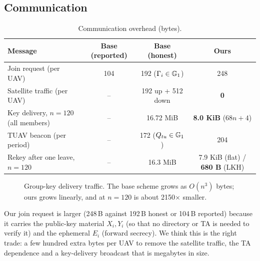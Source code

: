 \subsection{Communication}
\begin{table}[H]
\centering\small
\caption{Communication overhead (bytes).}
\label{tab:comm}
\begin{tabularx}{\linewidth}{@{}>{\raggedright\arraybackslash}X ccc@{}}
\toprule
Message & Base (reported) & Base (honest) & \textbf{Ours}\\
\midrule
Join request (per UAV) & 104 & 192 ($\Gamma_i\in\mathbb{G}_1$) & 248\\
Satellite traffic (per UAV) & -- & 192 up + 512 down & \textbf{0}\\
Key delivery, $n=120$ (all members) & -- & 16.72 MiB & \textbf{8.0 KiB} ($68n+4$)\\
TUAV beacon (per period) & -- & 172 ($Q_{tu}\in\mathbb{G}_1$) & 204\\
Rekey after one leave, $n=120$ & -- & 16.3 MiB & 7.9 KiB (flat) \;/\; \textbf{680 B} (LKH)\\
\bottomrule
\end{tabularx}
\end{table}

\begin{figure}[H]
\centering
{}
\caption{Group-key delivery traffic. The base scheme grows as $O(n^3)$ bytes; ours grows linearly, and at $n=120$ is about 2150$\times$ smaller.}
\label{fig:keybytes}
\end{figure}

\begin{whybox}[title={The trade-off we accept}]
Our join request is larger (248\,B against 192\,B honest or 104\,B reported) because it carries the public-key material $X_i,Y_i$ (so that no directory or TA is
needed to verify it) and the ephemeral $E_i$ (forward secrecy). We think this is the right trade: a few hundred extra bytes per UAV to remove the satellite traffic,
the TA dependence and a key-delivery broadcast that is megabytes in size.
\end{whybox}

